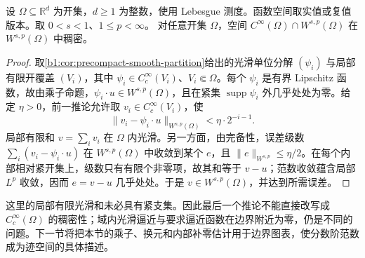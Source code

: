 \begin{corollary}\label{b1:cor:fractional-domain-smooth-density}
设 \(\Omega\subseteq\mathbb R^d\) 为开集，\(d\geq1\) 为整数，使用 Lebesgue 测度。函数空间取实值或复值版本。取 \(0<s<1\)、\(1\leq p<\infty\)。
对任意开集 \(\Omega\)，空间 \(C^\infty(\Omega)\cap W^{s,p}(\Omega)\) 在 \(W^{s,p}(\Omega)\) 中稠密。
\end{corollary}
\begin{proof}
取\cref{b1:cor:precompact-smooth-partition}给出的光滑单位分解 \((\psi_i)\) 与局部有限开覆盖 \((V_i)\)，其中 \(\psi_i\in C_c^\infty(V_i)\)、\(V_i\Subset\Omega\)。每个 \(\psi_i\) 是有界 Lipschitz 函数，故由乘子命题，\(\psi_i\cdot u\in W^{s,p}(\Omega)\)，且在紧集 \(\operatorname{supp}\psi_i\) 外几乎处处为零。给定 \(\eta>0\)，前一推论允许取 \(v_i\in C_c^\infty(V_i)\)，使
\[
 \|v_i-\psi_i\cdot u\|_{W^{s,p}(\Omega)}<\eta\cdot2^{-i-1}.
\]
局部有限和 \(v=\sum_i v_i\) 在 \(\Omega\) 内光滑。另一方面，由完备性，误差级数 \(\sum_i(v_i-\psi_i\cdot u)\) 在 \(W^{s,p}(\Omega)\) 中收敛到某个 \(e\)，且 \(\|e\|_{W^{s,p}}\leq\eta/2\)。在每个内部相对紧开集上，级数只有有限个非零项，故其和等于 \(v-u\)；范数收敛蕴含局部 \(L^p\) 收敛，因而 \(e=v-u\) 几乎处处。于是 \(v\in W^{s,p}(\Omega)\)，并达到所需误差。
\end{proof}

这里的局部有限光滑和未必具有紧支集。因此最后一个推论不能直接改写成 \(C_c^\infty(\Omega)\) 的稠密性；域内光滑逼近与要求逼近函数在边界附近为零，仍是不同的问题。下一节将把本节的乘子、换元和内部补零估计用于边界图表，使分数阶范数成为迹空间的具体描述。
